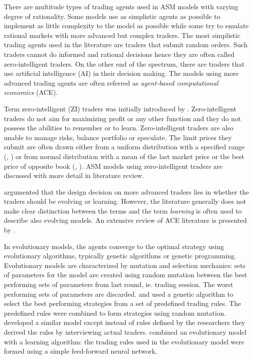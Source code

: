 There are multitude types of trading agents used in ASM models with varying degree
of rationality. Some models use as simplistic agents as possible to implement as
little complexity to the model as possible while some try to emulate rational 
markets with more advanced but complex traders. The most simplistic trading agents
used in the literature are traders that submit random orders. Such traders
cannot do informed and rational decisions hence they are often called
zero-intelligent traders. On the other end of the spectrum, there are traders
that use artificial intelligence (AI) in their decision making. The models using
more advanced trading agents are often referred as \emph{agent-based computational
economics} (ACE).

Term zero-intelligent (ZI) traders was initially introduced by \citet{God93}. Zero-intelligent
traders do not aim for maximizing profit or any other function and they do not 
possess the abilities to remember or to learn. Zero-intelligent traders are also unable
to manage risks, balance portfolio or speculate. The limit prices they submit are
often drawn either from a uniform distribution with a specified range (\citet{God93}, \citet{Mil08}) 
or from normal distribution with a mean of the last market price or the
best price of opposite book (\citet{LIU20082535}, \citet{Genoa01}). ASM models using
zero-intelligent traders are discussed with more detail in literature review. 

\citet{LeBranon2000} argumented that the design decision on more advanced traders 
lies in whether the traders should be evolving or learning. However, the literature
generally does not make clear distinction between the terms and the term \emph{learning}
is often used to describe also evolving models. An extensive review of ACE literature 
is presented by \citet{ACE12}.

In evolutionary models, the agents converge to the optimal strategy using evolutionary algorithms, typically
genetic algorithms or genetic programming. Evolutionary models are characterized by 
mutation and selection mechanics: sets of parameters for the model are created 
using random mutation between the best performing sets of parameters from last 
round, ie. trading session. The worst performing sets of parameters are discarded.
\citet{GenAlgASM18} and \citet{GenAlgBTCASM19} used a genetic algorithm to select 
the best performing strategies from a set of predefined trading rules. The predefined
rules were combined to form strategies using random mutation. \citet{IZUMI200535} developed a 
similar model except instead of rules defined by the researchers they derived the rules 
by interviewing actual traders. \citet{LeBranon2001} combined an evolutionary model with a 
learning algorithm: the trading rules used in the evolutionary model were formed using a 
simple feed-forward neural network.

